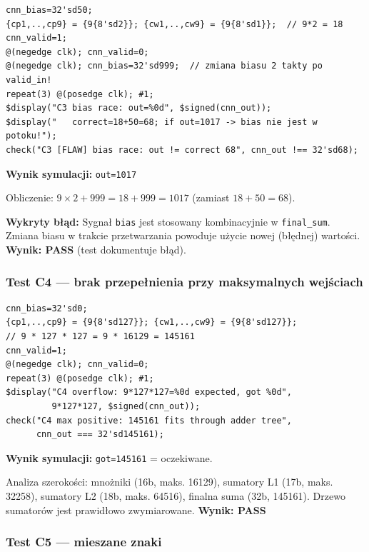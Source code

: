\documentclass[12pt,a4paper]{article}
\begin{document}
\begin{lstlisting}
cnn_bias=32'sd50;
{cp1,..,cp9} = {9{8'sd2}}; {cw1,..,cw9} = {9{8'sd1}};  // 9*2 = 18
cnn_valid=1;
@(negedge clk); cnn_valid=0;
@(negedge clk); cnn_bias=32'sd999;  // zmiana biasu 2 takty po valid_in!
repeat(3) @(posedge clk); #1;
$display("C3 bias race: out=%0d", $signed(cnn_out));
$display("   correct=18+50=68; if out=1017 -> bias nie jest w potoku!");
check("C3 [FLAW] bias race: out != correct 68", cnn_out !== 32'sd68);
\end{lstlisting}

\begin{failbox}
\textbf{Wynik symulacji:} \texttt{out=1017}

Obliczenie: $9 \times 2 + 999 = 18 + 999 = 1017$ (zamiast $18 + 50 = 68$).

\textbf{Wykryty błąd:} Sygnał \texttt{bias} jest stosowany kombinacyjnie w \texttt{final\_sum}. Zmiana biasu w trakcie przetwarzania powoduje użycie nowej (błędnej) wartości. \textbf{Wynik: PASS} (test dokumentuje błąd).
\end{failbox}

\subsubsection*{Test C4 — brak przepełnienia przy maksymalnych wejściach}

\begin{lstlisting}
cnn_bias=32'sd0;
{cp1,..,cp9} = {9{8'sd127}}; {cw1,..,cw9} = {9{8'sd127}};
// 9 * 127 * 127 = 9 * 16129 = 145161
cnn_valid=1;
@(negedge clk); cnn_valid=0;
repeat(3) @(posedge clk); #1;
$display("C4 overflow: 9*127*127=%0d expected, got %0d",
         9*127*127, $signed(cnn_out));
check("C4 max positive: 145161 fits through adder tree",
      cnn_out === 32'sd145161);
\end{lstlisting}

\begin{passbox}
\textbf{Wynik symulacji:} \texttt{got=145161} = oczekiwane.

Analiza szerokości: mnożniki (16b, maks. 16129), sumatory L1 (17b, maks. 32258), sumatory L2 (18b, maks. 64516), finalna suma (32b, 145161). Drzewo sumatorów jest prawidłowo zwymiarowane. \textbf{Wynik: PASS}
\end{passbox}

\subsubsection*{Test C5 — mieszane znaki}
\end{document}
